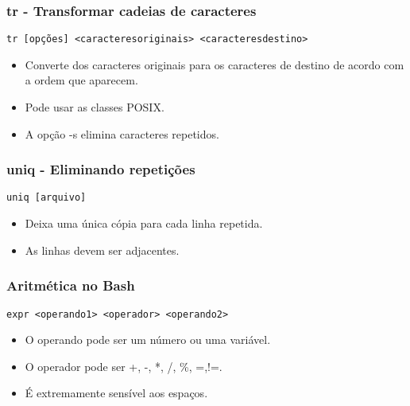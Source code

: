 \documentclass{beamer}
\begin{document}
\begin{frame}[fragile]
   \frametitle{tr - Transformar cadeias de caracteres}
   \begin{center}
      \begin{verbatim}
tr [opções] <caracteresoriginais> <caracteresdestino>
      \end{verbatim}
   \end{center}
   \begin{itemize}
      \item Converte dos caracteres originais para os caracteres de destino de acordo com a ordem que aparecem.
      \item Pode usar as classes POSIX.
      \item A opção -s elimina caracteres repetidos.
   \end{itemize}
\end{frame}

\begin{frame}[fragile]
   \frametitle{uniq - Eliminando repetições}
   \begin{center}
      \begin{verbatim} 
uniq [arquivo]
      \end{verbatim}
   \end{center}
   \begin{itemize}
      \item Deixa uma única cópia para cada linha repetida.
      \item As linhas devem ser adjacentes.
   \end{itemize}
\end{frame}

\begin{frame}[fragile]
   \frametitle{Aritmética no Bash}
   \begin{center}
      \begin{verbatim}
expr <operando1> <operador> <operando2>
      \end{verbatim}
   \end{center}
   \begin{itemize}
      \item O operando pode ser um número ou uma variável.
      \item O operador pode ser +, -, *, /, \%, =,!=.
      \item É extremamente sensível aos espaços.
   \end{itemize}
\end{frame}
\end{document}
